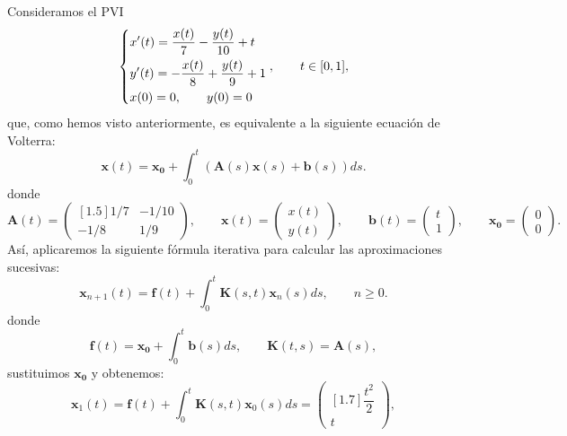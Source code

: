 \begin{ejemplo}
	Consideramos el PVI
	\begin{equation}
		\begin{dcases} x'(t) = \dfrac{x(t)}{7}-\dfrac{y(t)}{10} + t \\ y'(t) = -\dfrac{x(t)}{8} +\dfrac{y(t)}{9} +1 \\ x(0) = 0, \qquad y(0) = 0 \end{dcases}, \qquad t \in [0,1],
	\end{equation}
	que, como hemos visto anteriormente, es equivalente a la siguiente ecuación de Volterra:
	\begin{equation}
		\textbf{x}(t)= \textbf{x}_\textbf{0} + \int_0^t (\textbf{A}(s)\textbf{x}(s)+\textbf{b}(s))ds.
	\end{equation}
	donde
	\begin{equation}
		\textbf{A}(t) = \begin{pmatrix}[1.5]
			1/7 & -1/10 \\ 
			-1/8 & 1/9
		\end{pmatrix}, \qquad \textbf{x}(t) = \begin{pmatrix}
			x(t) \\ y(t)
		\end{pmatrix}, \qquad \textbf{b}(t) = \begin{pmatrix}
			t \\ 1
		\end{pmatrix}, \qquad \textbf{x}_\textbf{0} = \begin{pmatrix}
		0 \\ 0
		\end{pmatrix}.
	\end{equation}
	Así, aplicaremos la siguiente fórmula iterativa para calcular las aproximaciones sucesivas:
	\begin{equation}
		\textbf{x}_{n+1}(t) = \textbf{f}(t) + \int_0^t \textbf{K}(s,t)\textbf{x}_n(s)ds, \qquad n \geqslant 0.
	\end{equation}
	donde
	\begin{equation}
		\textbf{f}(t) = \textbf{x}_\textbf{0} + \int_0^t \textbf{b}(s)ds, \qquad \textbf{K}(t,s) = \textbf{A}(s),
	\end{equation}
	sustituimos $\textbf{x}_\textbf{0}$ y obtenemos:
	\begin{equation}
		\textbf{x}_{1}(t) = \textbf{f}(t) + \int_0^t \textbf{K}(s,t)\textbf{x}_0(s)ds = \begin{pmatrix}[1.7]	\dfrac{t^2}{2} \\ t 	\end{pmatrix},

\end{equation}
\end{ejemplo}

